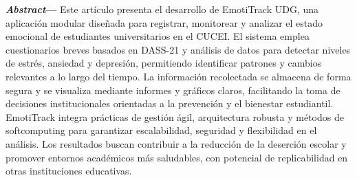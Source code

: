 ﻿\documentclass[10pt,twocolumn]{article}
\begin{document}
\noindent\textbf{\textit{Abstract}}\textbf{---} Este artículo presenta el desarrollo de EmotiTrack UDG, una aplicación modular diseñada para registrar, monitorear y analizar el estado emocional de estudiantes universitarios en el CUCEI. El sistema emplea cuestionarios breves basados en DASS-21 y análisis de datos para detectar niveles de estrés, ansiedad y depresión, permitiendo identificar patrones y cambios relevantes a lo largo del tiempo. La información recolectada se almacena de forma segura y se visualiza mediante informes y gráficos claros, facilitando la toma de decisiones institucionales orientadas a la prevención y el bienestar estudiantil. EmotiTrack integra prácticas de gestión ágil, arquitectura robusta y métodos de softcomputing para garantizar escalabilidad, seguridad y flexibilidad en el análisis. Los resultados buscan contribuir a la reducción de la deserción escolar y promover entornos académicos más saludables, con potencial de replicabilidad en otras instituciones educativas.
\end{document}
